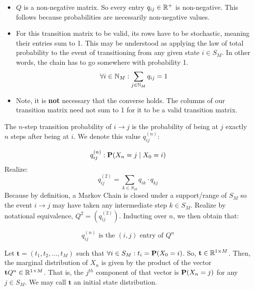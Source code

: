 \begin{itemize}
\item $Q$ is a non-negative matrix. So every entry $q_{ij} \in \R^+$ is non-negative. This follows because probabilities are necessarily non-negative values.
\item For this transition matrix to be valid, its rows have to be stochastic, meaning their entries sum to 1. This may be understood as applying the law of total probability to the event of transitioning from any given state $i \in S_M$. In other words, the chain has to go somewhere with probability 1.
$$\forall i \in \N_M: \sum_{j \in \N_M} q_{ij} = 1$$
\item Note, it is \textbf{not} necessary that the converse holds. The columns of our transition matrix need not sum to 1 for it to be a valid transition matrix.
\end{itemize}

\begin{definition} The $n$-step transition probability of $i \to j$ is the probability of being at $j$ exactly $n$ steps after being at $i$. We denote this value $q_{ij}^{(n)}:$
\end{definition}

$$ q_{ij}^{(n)}: \Prb(X_n = j \mid X_0 = i)$$
Realize:
$$q_{ij}^{(2)} = \sum_{k \in S_M} q_{ik}\cdot q_{kj}$$
Because by definition, a Markov Chain is closed under a support/range of $S_M$ so the event $i \to j$ may have taken any intermediate step $k \in S_M$. Realize by notational equivalence, $Q^2 = (q_{ij}^{(2)})$. Inducting over $n$, we then obtain that:

$$q_{ij}^{(n)} \text{ is the } (i,j) \text{ entry of } Q^n$$

\begin{definition} Let $\textbf{t} = (t_1,t_2,\dots,t_M)$ such that $\forall i \in S_M : t_i = \Prb(X_0 = i)$. So, $\textbf{t} \in \R^{1 \times M}$. Then, the marginal distribution of $X_n$ is given by the product of the vector $\textbf{t} Q^n \in \R^{1 \times M}$. That is, the $j^{th}$ component of that vector is $\P(X_n = j)$ for any $j \in S_M$. We may call $\textbf{t}$ an initial state distribution.
\end{definition}


